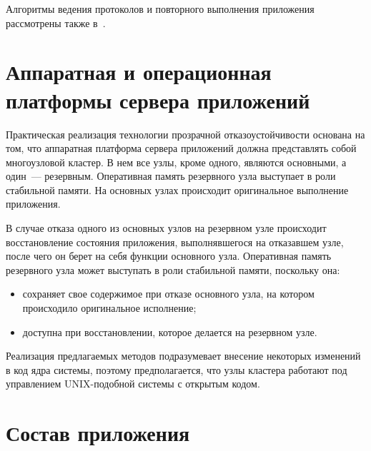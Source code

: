 \begin{multicols}{2}
Алгоритмы ведения протоколов и повторного выполнения приложения
рассмотрены также в~\cite{9zak}.


\section{Аппаратная и операционная платформы сервера
приложений}

Практическая реализация технологии прозрачной отказоустойчивости
основана на том, что аппаратная платформа сервера приложений должна
представлять собой многоузловой кластер. В нем все узлы, кроме одного,
являются основными, а один~--- резервным. Оперативная память резервного
узла выступает в роли стабильной памяти. На основных узлах происходит
оригинальное выполнение приложения.

В случае отказа одного из основных узлов на резервном узле происходит
восстановление состояния приложения, выполнявшегося на отказавшем узле,
после чего он берет на себя функции основного узла. Оперативная память
резервного узла может выступать в роли стабильной памяти, поскольку она: %
\begin{itemize}
\item сохраняет свое содержимое при отказе основного узла, на
котором происходило оригинальное исполнение; %
\item доступна при восстановлении, которое делается на резервном узле.
\end{itemize}

Реализация предлагаемых методов подразумевает внесение некоторых
изменений в код ядра сис\-те\-мы, поэтому предполагается, что узлы кластера
работают под управлением UNIX-подобной сис\-те\-мы с открытым кодом.

\vspace*{-6pt}
\section{Состав приложения}
\vspace*{-2pt}


\end{multicols}
